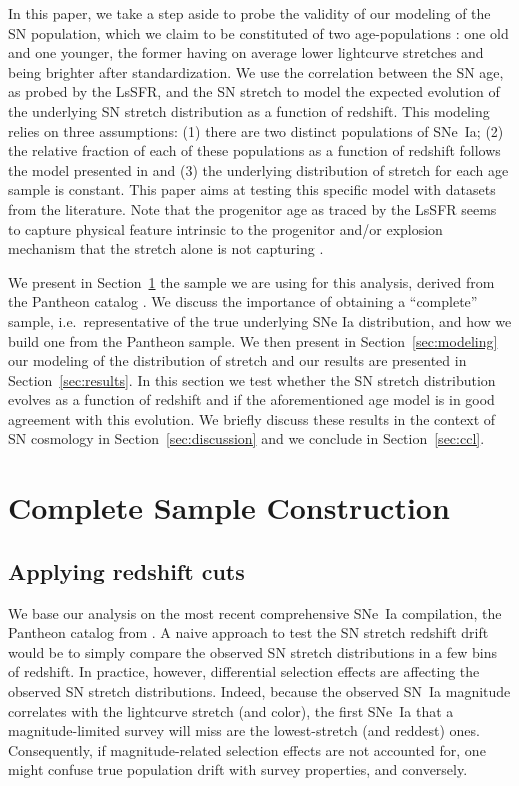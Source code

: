 \documentclass[]{aa}
\begin{document}
In this paper, we take a step aside to probe the validity of our modeling of the
SN population, which we claim to be constituted of two age-populations
\citep{rigault2013,rigault2015,rigault2018}: one old and one younger, the former
having on average lower lightcurve stretches and being brighter after
standardization. We use the correlation between the SN age, as probed by the
LsSFR, and the SN stretch to model the expected evolution of the underlying SN
stretch distribution as a function of redshift. This modeling relies on three
assumptions: (1) there are two distinct populations of SNe~Ia; (2) the relative
fraction of each of these populations as a function of redshift follows the
model presented in \cite{rigault2018} and (3) the underlying distribution of
stretch for each age sample is constant. This paper aims at testing this
specific model with datasets from the literature. Note that the progenitor age
as traced by the LsSFR seems to capture physical feature intrinsic to the
progenitor and/or explosion mechanism that the stretch alone is not capturing
\citep{nordin2018}.

We present in Section~\ref{sec:sample} the sample we are using for this
analysis, derived from the Pantheon catalog \citep{scolnic2018a}. We discuss the
importance of obtaining a ``complete'' sample, i.e.\ representative of the true
underlying SNe Ia distribution, and how we build one from the Pantheon sample.
We then present in Section~\ref{sec:modeling} our modeling of the distribution
of stretch and our results are presented in Section~\ref{sec:results}. In this
section we test whether the SN stretch distribution evolves as a function of
redshift and if the aforementioned age model is in good agreement with this
evolution. We briefly discuss these results in the context of SN cosmology in
Section~\ref{sec:discussion} and we conclude in Section~\ref{sec:ccl}.

\section{Complete Sample Construction}\label{sec:sample}
\subsection{Applying redshift cuts}\label{ssec:cuts}

We base our analysis on the most recent comprehensive SNe~Ia compilation, the
Pantheon catalog from \cite{scolnic2018a}. A naive approach to test the SN
stretch redshift drift would be to simply compare the observed SN stretch
distributions in a few bins of redshift. In practice, however, differential
selection effects are affecting the observed SN stretch distributions. Indeed,
because the observed SN~Ia magnitude correlates with the lightcurve stretch (and
color), the first SNe~Ia that a magnitude-limited survey will miss are the
lowest-stretch (and reddest) ones. Consequently, if magnitude-related selection
effects are not accounted for, one might confuse true population drift with
survey properties, and conversely.
\end{document}

